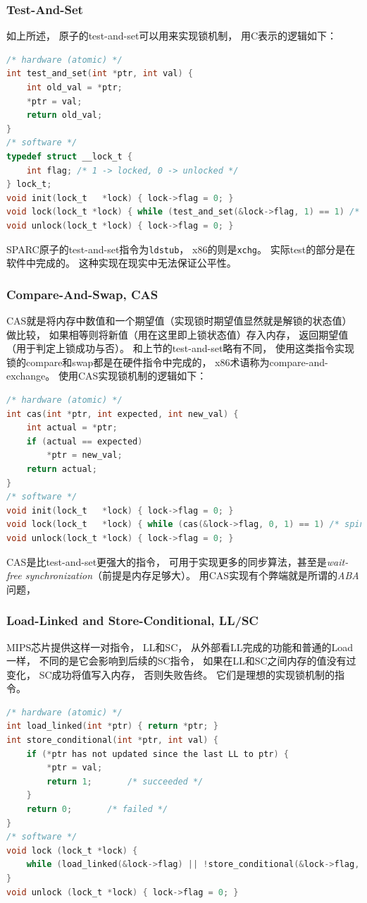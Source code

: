 \documentclass[11pt]{article}
\begin{document}
\subsubsection{Test-And-Set}
如上所述，
原子的test-and-set可以用来实现锁机制，
用C表示的逻辑如下：
\begin{lstlisting}[language=C]
/* hardware (atomic) */
int test_and_set(int *ptr, int val) {
	int old_val = *ptr;
	*ptr = val;
	return old_val;
}
/* software */
typedef struct __lock_t {
	int flag; /* 1 -> locked, 0 -> unlocked */
} lock_t;
void init(lock_t   *lock) { lock->flag = 0; }
void lock(lock_t *lock) { while (test_and_set(&lock->flag, 1) == 1) /* spin */ ; }
void unlock(lock_t *lock) { lock->flag = 0; }
  \end{lstlisting}
SPARC原子的test-and-set指令为\verb|ldstub|，
x86的则是\verb|xchg|。
实际test的部分是在软件中完成的。
这种实现在现实中无法保证公平性。

\subsubsection{Compare-And-Swap, CAS}
CAS就是将内存中数值和一个期望值（实现锁时期望值显然就是解锁的状态值）做比较，
如果相等则将新值（用在这里即上锁状态值）存入内存，
返回期望值（用于判定上锁成功与否）。
和上节的test-and-set略有不同，
使用这类指令实现锁的compare和swap都是在硬件指令中完成的，
x86术语称为compare-and-exchange。
使用CAS实现锁机制的逻辑如下：
\begin{lstlisting}[language=C]
/* hardware (atomic) */
int cas(int *ptr, int expected, int new_val) {
	int actual = *ptr;
	if (actual == expected)
		*ptr = new_val;
	return actual;
}
/* software */
void init(lock_t   *lock) { lock->flag = 0; }
void lock(lock_t   *lock) { while (cas(&lock->flag, 0, 1) == 1) /* spin */; }
void unlock(lock_t *lock) { lock->flag = 0; }
\end{lstlisting}
CAS是比test-and-set更强大的指令，
可用于实现更多的同步算法，甚至是{\em wait-free synchronization}（前提是内存足够大）。
用CAS实现有个弊端就是所谓的{\em ABA}问题，

\subsubsection{Load-Linked and Store-Conditional, LL/SC}
MIPS芯片提供这样一对指令，
LL和SC，
从外部看LL完成的功能和普通的Load一样，
不同的是它会影响到后续的SC指令，
如果在LL和SC之间内存的值没有过变化，
SC成功将值写入内存，
否则失败告终。
它们是理想的实现锁机制的指令。
\begin{lstlisting}[language=C]
/* hardware (atomic) */
int load_linked(int *ptr) { return *ptr; }
int store_conditional(int *ptr, int val) {
	if (*ptr has not updated since the last LL to ptr) {
		*ptr = val;
		return 1;		/* succeeded */
	}
	return 0;		/* failed */
}
/* software */
void lock (lock_t *lock) {
	while (load_linked(&lock->flag) || !store_conditional(&lock->flag, 1)) ;
}
void unlock (lock_t *lock) { lock->flag = 0; }
  \end{lstlisting}
\end{document}
